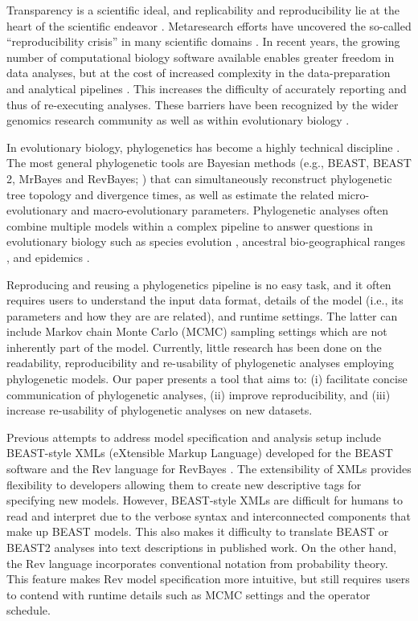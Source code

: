 \documentclass[10pt,letterpaper,table]{article}
\begin{document}
Transparency is a scientific ideal, and replicability and
reproducibility lie at the heart of the scientific endeavor
\cite{nas19,munafo17}. 
Metaresearch efforts have uncovered the so-called ``reproducibility
crisis'' \cite{baker16} in many scientific domains \cite{baker16}. 
In recent years, the growing number of computational biology software available enables greater freedom in data analyses, 
but at the cost of increased complexity in the data-preparation and analytical pipelines \cite{eren2021community}. 
This increases the difficulty of accurately reporting and thus of re-executing analyses. 
These barriers have been recognized by the wider genomics research community \cite{eren2021community} as well as within evolutionary biology \cite{oakley2014osiris}. 

In evolutionary biology, phylogenetics has become a highly technical discipline \cite{oakley2014osiris}. 
The most general phylogenetic tools are Bayesian methods (e.g., BEAST, BEAST 2, MrBayes and
RevBayes; \cite{beast,beast2,revbayes,mrbayes}) 
that can simultaneously reconstruct phylogenetic tree topology and divergence times, as well as estimate the related micro-evolutionary and macro-evolutionary parameters. 
Phylogenetic analyses often combine 
multiple models within a complex pipeline to answer questions in evolutionary biology such as species evolution \cite{gavryushkina17,ogilvie21,zhang21}, ancestral bio-geographical ranges \cite{lemey10,landis18}, and 
epidemics \cite{faria21,douglas21}. 

Reproducing and reusing a phylogenetics pipeline is no easy task, and it 
often requires users to understand the input data format, details of the model (i.e., its parameters and how they are are related), and runtime settings. 
The latter can include Markov chain Monte Carlo (MCMC) sampling settings which are not inherently part of the model.
Currently, little research has been done on the readability, reproducibility and re-usability of phylogenetic analyses employing phylogenetic models. 
Our paper presents a tool that aims to: (i) facilitate concise communication of phylogenetic analyses, (ii) improve reproducibility, and (iii) increase re-usability of phylogenetic analyses on new datasets. 
 
Previous attempts to address model specification and analysis setup include BEAST-style XMLs (eXtensible Markup Language) developed for the BEAST software \cite{beast,beast2} and the Rev language for RevBayes \cite{revbayes}. 
The extensibility of XMLs provides flexibility to developers allowing them to create new
descriptive tags for specifying new models.
However, BEAST-style XMLs are difficult for humans to read and interpret due to the verbose syntax and interconnected components that make up BEAST models. 
This also makes it difficulty to translate BEAST or BEAST2 analyses into text descriptions in published work. 
On the other hand, the Rev language 
\cite{revbayes} 
incorporates conventional notation from probability theory. 
This feature makes Rev model specification more intuitive, but still requires users to contend with runtime 
details %
such as MCMC settings and the operator schedule.
\end{document}
